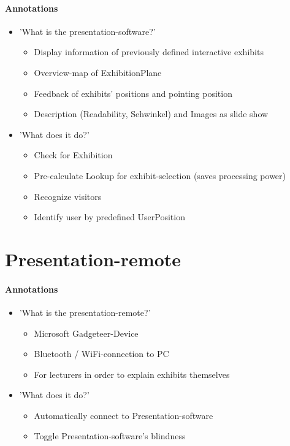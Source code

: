 \paragraph{Annotations}

\begin{itemize}
	\item 'What is the presentation-software?'
	\begin{itemize}
		\item Display information of previously defined interactive exhibits
		\item Overview-map of ExhibitionPlane
		\item Feedback of exhibits' positions and pointing position
		\item Description (Readability, Sehwinkel) and Images as slide show
	\end{itemize}
	\item 'What does it do?'
	\begin{itemize}
		\item Check for Exhibition
		\item Pre-calculate Lookup for exhibit-selection (saves processing power)
		\item Recognize visitors
		\item Identify user by predefined UserPosition 
	\end{itemize}
\end{itemize}



\section{Presentation-remote}
\label{implementation_remote}

\paragraph{Annotations}

\begin{itemize}
	\item 'What is the presentation-remote?'
	\begin{itemize}
		\item Microsoft Gadgeteer-Device
		\item Bluetooth / WiFi-connection to PC
		\item For lecturers in order to explain exhibits themselves
	\end{itemize}
	\item 'What does it do?'
	\begin{itemize}
		\item Automatically connect to Presentation-software
		\item Toggle Presentation-software's blindness
	\end{itemize}
\end{itemize}



